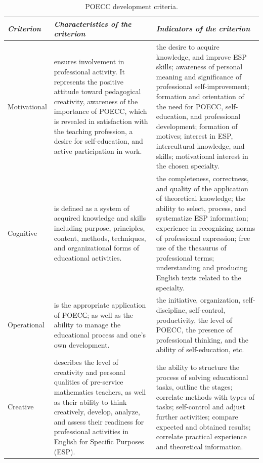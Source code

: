 \begin{table}[htpb]
\centering
\caption{POECC development criteria.}
\label{tab-01}
\begin{threeparttable}
\begin{tabular}{l p{5cm} p{7cm}} 
\toprule
\emph{Criterion} & \emph{Characteristics of the criterion} & \emph{Indicators of the criterion} \\
\midrule
Motivational & ensures involvement in professional activity. It represents the positive attitude toward pedagogical creativity, awareness of the importance of POECC, which is revealed in satisfaction with the teaching profession, a desire for self-education, and active participation in work. & the desire to acquire knowledge, and improve	ESP skills; awareness of personal meaning and significance of	professional self-improvement; formation and orientation of the need for	POECC, self-education, and professional development; formation of motives; interest in ESP, intercultural knowledge, and skills; motivational interest in the chosen specialty. \\

Cognitive & is defined as a system of acquired knowledge and skills including purpose, principles, content, methods, techniques, and organizational forms of educational activities. & the completeness, correctness, and quality of the application of theoretical knowledge; the ability to select, process, and systematize ESP information; experience in recognizing norms of professional expression; free use of the thesaurus of professional terms; understanding and producing English texts related to the specialty. \\

Operational & is the appropriate application of POECС; as well as the ability to manage the educational process and one's own development. & the initiative, organization, self-discipline, self-control, productivity, the level of POECC, the presence of professional thinking, and the ability of self-education, etc. \\

Creative & describes the level of creativity and personal qualities of pre-service mathematics teachers, as well as their ability to think creatively, develop, analyze, and assess their readiness for professional activities in English for Specific Purposes (ESP). & the	ability to structure the process of solving educational tasks, outline the stages; correlate methods with types of tasks; self-control and adjust further activities; compare expected and obtained results; correlate practical experience and theoretical information. \\
\bottomrule
\end{tabular}
\end{threeparttable}
\end{table}

